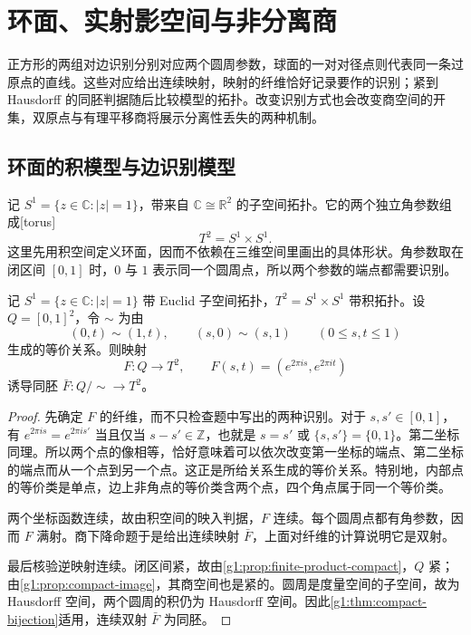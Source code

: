 
% 
% 
% 

\section{环面、实射影空间与非分离商}
\label{g1:sec:0405}

正方形的两组对边识别分别对应两个圆周参数，球面的一对对径点则代表同一条过原点的直线。这些对应给出连续映射，映射的纤维恰好记录要作的识别；紧到 Hausdorff 的同胚判据随后比较模型的拓扑。改变识别方式也会改变商空间的开集，双原点与有理平移商将展示分离性丢失的两种机制。

\subsection{环面的积模型与边识别模型}
\label{g1:subsec:0405:01}

记 \(S^1=\{z\in\mathbb C:|z|=1\}\)，带来自 \(\mathbb C\cong\mathbb R^2\) 的子空间拓扑。它的两个独立角参数组成[torus]
\[
	T^2=S^1\times S^1.
\]
这里先用积空间定义环面，因而不依赖在三维空间里画出的具体形状。角参数取在闭区间 \([0,1]\) 时，\(0\) 与 \(1\) 表示同一个圆周点，所以两个参数的端点都需要识别。

\begin{theorem}\label{g1:thm:torus-square}
	记 \(S^1=\{z\in\mathbb C:|z|=1\}\) 带 Euclid 子空间拓扑，\(T^2=S^1\times S^1\) 带积拓扑。设 \(Q=[0,1]^2\)，令 \(\sim\) 为由
	\[
		(0,t)\sim(1,t),\qquad (s,0)\sim(s,1)\qquad(0\le s,t\le1)
	\]
	生成的等价关系。则映射
	\[
		F:Q\longrightarrow T^2,\qquad F(s,t)=(e^{2\pi is},e^{2\pi it})
	\]
	诱导同胚 \(\bar F:Q/{\sim}\to T^2\)。
\end{theorem}
\begin{proof}
	先确定 \(F\) 的纤维，而不只检查题中写出的两种识别。对于 \(s,s'\in[0,1]\)，有 \(e^{2\pi is}=e^{2\pi is'}\) 当且仅当 \(s-s'\in\mathbb Z\)，也就是 \(s=s'\) 或 \(\{s,s'\}=\{0,1\}\)。第二坐标同理。所以两个点的像相等，恰好意味着可以依次改变第一坐标的端点、第二坐标的端点而从一个点到另一个点。这正是所给关系生成的等价关系。特别地，内部点的等价类是单点，边上非角点的等价类含两个点，四个角点属于同一个等价类。

	两个坐标函数连续，故由积空间的映入判据，\(F\) 连续。每个圆周点都有角参数，因而 \(F\) 满射。商下降命题于是给出连续映射 \(\bar F\)，上面对纤维的计算说明它是双射。

	最后核验逆映射连续。闭区间紧，故由\cref{g1:prop:finite-product-compact}，\(Q\) 紧；由\cref{g1:prop:compact-image}，其商空间也是紧的。圆周是度量空间的子空间，故为 Hausdorff 空间，两个圆周的积仍为 Hausdorff 空间。因此\cref{g1:thm:compact-bijection}适用，连续双射 \(\bar F\) 为同胚。
\end{proof}

